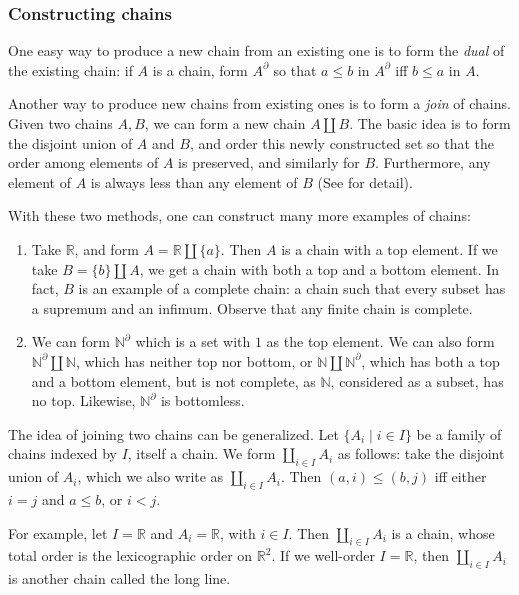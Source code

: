 \documentclass{article}
\begin{document}
\subsubsection*{Constructing chains}

One easy way to produce a new chain from an existing one is to form the \emph{dual} of the existing chain: if $A$ is a chain, form $A^{\partial}$ so that $a\le b$ in $A^{\partial}$ iff $b\le a$ in $A$.

Another way to produce new chains from existing ones is to form a \emph{join} of chains.  Given two chains $A,B$, we can form a new chain $A\coprod B$.  The basic idea is to form the disjoint union of $A$ and $B$, and order this newly constructed set so that the order among elements of $A$ is preserved, and similarly for $B$.  Furthermore, any element of $A$ is always less than any element of $B$ (See  for detail).

With these two methods, one can construct many more examples of chains:
\begin{enumerate}
\item Take $\mathbb{R}$, and form $A=\mathbb{R}\coprod \lbrace a\rbrace$.  Then $A$ is a chain with a top element.  If we take $B=\lbrace b\rbrace \coprod A$, we get a chain with both a top and a bottom element.  In fact, $B$ is an example of a complete chain: a chain such that every subset has a supremum and an infimum.  Observe that any finite chain is complete.
\item We can form $\mathbb{N}^{\partial}$ which is a set with $1$ as the top element.  We can also form $\mathbb{N}^{\partial}\coprod \mathbb{N}$, which has neither top nor bottom, or $\mathbb{N}\coprod \mathbb{N}^{\partial}$, which has both a top and a bottom element, but is not complete, as $\mathbb{N}$, considered as a subset, has no top.  Likewise, $\mathbb{N}^{\partial}$ is bottomless.
\end{enumerate}

The idea of joining two chains can be generalized.  Let $\lbrace A_i\mid i\in I\rbrace$ be a family of chains indexed by $I$, itself a chain.  We form $\coprod_{i\in I} A_i$ as follows: take the disjoint union of $A_i$, which we also write as $\coprod_{i\in I} A_i$.  Then $(a,i)\le (b,j)$ iff either $i=j$ and $a\le b$, or $i<j$.

For example, let $I=\mathbb{R}$ and $A_i=\mathbb{R}$, with $i\in I$.  Then $\coprod_{i\in I}A_i$ is a chain, whose total order is the lexicographic order on $\mathbb{R}^2$.  If we well-order $I=\mathbb{R}$, then $\coprod_{i\in I}A_i$ is another chain called the long line.
\end{document}
